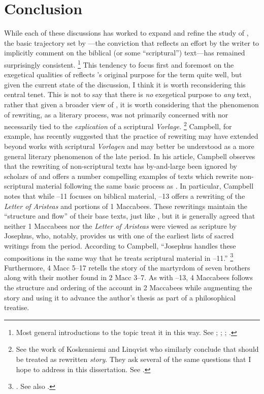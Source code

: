 \section{Conclusion}

While each of these discussions has worked to expand and refine the study of \rwb, the basic trajectory set by \vermes---the conviction that \rwb reflects an effort by the writer to implicitly comment on the biblical (or some ``scriptural'') text---has remained surprisingly consistent.%
    \footnote{%
        Most general introductions to the topic treat it in this way. See
        \cite{crawford_charlesworth2000};
        \cite{brooke_schiffman-vanderkam2000};
        \cite{zahn_lim-collins2010};
        \cite{zahn2011}.}
%
This tendency to focus first and foremost on the exegetical qualities of \rwb reflects \vermes's original purpose for the term quite well, but given the current state of the discussion, I think it is worth reconsidering this central tenet. This is not to say that there is \emph{no} exegetical purpose to \emph{any} \rwb text, rather that given a broader view of \rwb, it is worth considering that the phenomenon of rewriting, as a literary process, was not primarily concerned with nor necessarily tied to the \emph{explication} of a scriptural \emph{Vorlage}.%
    \footnote{%
        See the work of Koskenniemi and Linqvist who similarly conclude that \rwb should be treated as rewritten \emph{story}. They ask several of the same questions that I hope to address in this dissertation. See 
        \cite{koskenniemi-lindqvist_laato-ruiten2008}.}
%
Campbell, for example, has recently suggested that the practice of rewriting may have extended beyond works with scriptural \emph{Vorlagen} and may better be understood as a more general literary phenomenon of the late \secondtemple period.%
    \autocite{campbell_zsengeller2014} 
In his article, Campbell observes that the rewriting of non-scriptural texts has by-and-large been ignored by scholars of \rwb and offers a number compelling examples of \secondtemple texts which rewrite non-scriptural material following the same basic process as \rwb. In particular, Campbell notes that while --11 focuses on biblical material, --13 offers a rewriting of the \emph{Letter of Aristeas} and portions of 1 Maccabees. These rewritings maintain the ``structure and flow'' of their base texts, just like \rwb, but it is generally agreed that neither 1 Maccabees nor the \emph{Letter of Aristeas} were viewed as scripture by Josephus, who, notably, provides us with one of the earliest lists of sacred writings from the period.%
    \autocite{mason2002_mcdonald-sanders2002}
According to Campbell, ``Josephus handles these compositions in the same way that he treats scriptural material in --11.''%
    \footnote{%
        \Cite[70]{campbell_zsengeller2014}. See also
        \cite[126]{mason2002_mcdonald-sanders2002}.}
Furthermore, 4 Macc 5--17 retells the story of the martyrdom of seven brothers along with their mother found in 2 Macc 3--7. As with --13, 4 Maccabees follows the structure and ordering of the account in 2 Maccabees while augmenting the story and using it to advance the author's thesis as part of a philosophical treatise. 

